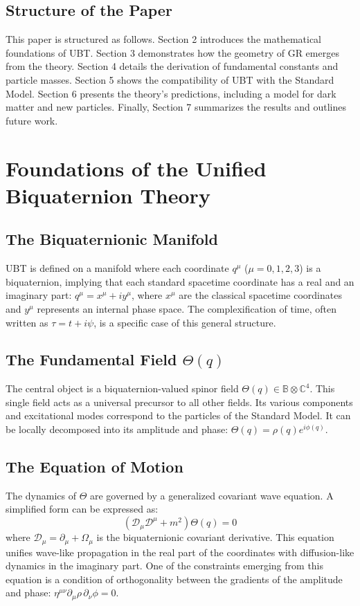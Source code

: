 \documentclass[12pt, a4paper]{article}
\begin{document}
\subsection{Structure of the Paper}
This paper is structured as follows. Section 2 introduces the mathematical foundations of UBT. Section 3 demonstrates how the geometry of GR emerges from the theory. Section 4 details the derivation of fundamental constants and particle masses. Section 5 shows the compatibility of UBT with the Standard Model. Section 6 presents the theory's predictions, including a model for dark matter and new particles. Finally, Section 7 summarizes the results and outlines future work.

\section{Foundations of the Unified Biquaternion Theory}

\subsection{The Biquaternionic Manifold}
UBT is defined on a manifold where each coordinate \(q^\mu\) (\(\mu=0,1,2,3\)) is a biquaternion, implying that each standard spacetime coordinate has a real and an imaginary part: \( q^\mu = x^\mu + i y^\mu \), where \(x^\mu\) are the classical spacetime coordinates and \(y^\mu\) represents an internal phase space. The complexification of time, often written as \( \tau = t + i\psi \), is a specific case of this general structure.

\subsection{The Fundamental Field \( \Theta(q) \)}
The central object is a biquaternion-valued spinor field \( \Theta(q) \in \mathbb{B} \otimes \mathbb{C}^4 \). This single field acts as a universal precursor to all other fields. Its various components and excitational modes correspond to the particles of the Standard Model. It can be locally decomposed into its amplitude and phase: \( \Theta(q) = \rho(q) e^{i\phi(q)} \).

\subsection{The Equation of Motion}
The dynamics of \( \Theta \) are governed by a generalized covariant wave equation. A simplified form can be expressed as:
\begin{equation}
    \left( \mathcal{D}_\mu \mathcal{D}^\mu + m^2 \right) \Theta(q) = 0
\end{equation}
where \( \mathcal{D}_\mu = \partial_\mu + \Omega_\mu \) is the biquaternionic covariant derivative. This equation unifies wave-like propagation in the real part of the coordinates with diffusion-like dynamics in the imaginary part. One of the constraints emerging from this equation is a condition of orthogonality between the gradients of the amplitude and phase: \( \eta^{\mu\nu} \partial_\mu \rho \, \partial_\nu \phi = 0 \).
\end{document}
